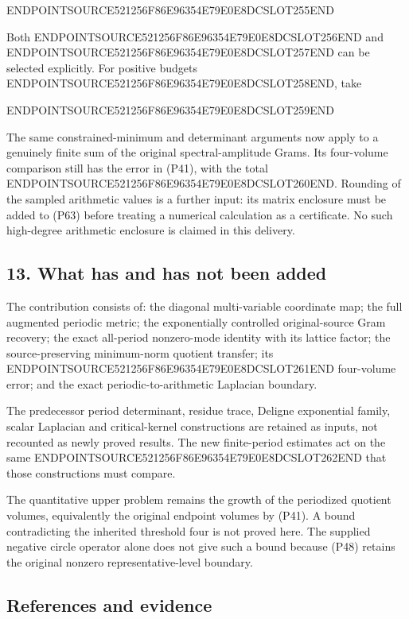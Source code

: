 ENDPOINTSOURCE521256F86E96354E79E0E8DCSLOT255END

Both ENDPOINTSOURCE521256F86E96354E79E0E8DCSLOT256END and ENDPOINTSOURCE521256F86E96354E79E0E8DCSLOT257END can be selected explicitly. For positive budgets ENDPOINTSOURCE521256F86E96354E79E0E8DCSLOT258END, take

ENDPOINTSOURCE521256F86E96354E79E0E8DCSLOT259END

The same constrained-minimum and determinant arguments now apply to a genuinely finite sum of the original spectral-amplitude Grams. Its four-volume comparison still has the error in (P41), with the total ENDPOINTSOURCE521256F86E96354E79E0E8DCSLOT260END. Rounding of the sampled arithmetic values is a further input: its matrix enclosure must be added to (P63) before treating a numerical calculation as a certificate. No such high-degree arithmetic enclosure is claimed in this delivery.

\subsection{13. What has and has not been added}\label{endpoint-periodized_original--what-has-and-has-not-been-added}

The contribution consists of: the diagonal multi-variable coordinate map; the full augmented periodic metric; the exponentially controlled original-source Gram recovery; the exact all-period nonzero-mode identity with its lattice factor; the source-preserving minimum-norm quotient transfer; its ENDPOINTSOURCE521256F86E96354E79E0E8DCSLOT261END four-volume error; and the exact periodic-to-arithmetic Laplacian boundary.

The predecessor period determinant, residue trace, Deligne exponential family, scalar Laplacian and critical-kernel constructions are retained as inputs, not recounted as newly proved results. The new finite-period estimates act on the same ENDPOINTSOURCE521256F86E96354E79E0E8DCSLOT262END that those constructions must compare.

The quantitative upper problem remains the growth of the periodized quotient volumes, equivalently the original endpoint volumes by (P41). A bound contradicting the inherited threshold four is not proved here. The supplied negative circle operator alone does not give such a bound because (P48) retains the original nonzero representative-level boundary.

\subsection{References and evidence}\label{endpoint-periodized_original--references-and-evidence}

